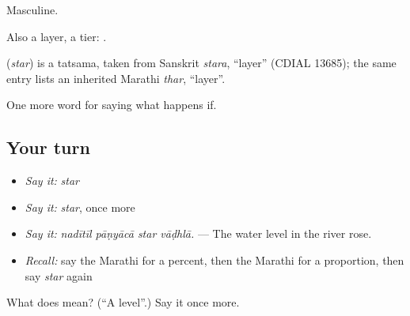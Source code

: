 Masculine.

Also a layer, a tier:  .

\begin{cousinweb}
\textbf{} (\emph{star}) is a tatsama, taken from Sanskrit \emph{stara}, \textquotedblleft{}layer\textquotedblright{} (CDIAL 13685); the same entry lists an inherited Marathi \emph{thar}, \textquotedblleft{}layer\textquotedblright{}.
\end{cousinweb}

\begin{grammarlens}[title={What you've built}]
One more word for saying what happens if.
\end{grammarlens}

\subsection*{Your turn}
\begin{itemize}
\raggedright
  \item \emph{Say it:} \emph{star}
  \item \emph{Say it:} \emph{star}, once more
  \item \emph{Say it:} \emph{nadītīl pāṇyācā star vāḍhlā.} — The water level in the river rose.
  \item \emph{Recall:} say the Marathi for a percent, then the Marathi for a proportion, then say \emph{star} again
\end{itemize}

\begin{tcolorbox}[breakable,colback=teal!4,colframe=teal!35!black,title={Before you move on}]
What does  mean? (\textquotedblleft{}A level\textquotedblright{}.) Say it once more.
\end{tcolorbox}
